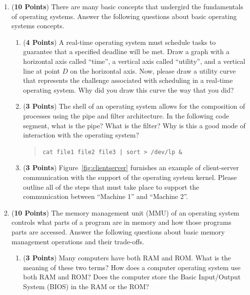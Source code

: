 \documentclass[12pt,epsf,psfig,graphics]{article}
\begin{document}
\begin{enumerate}
\item ({\bf 10 Points}) There are many basic concepts that undergird the fundamentals of operating systems.  Answer the
  following questions about basic operating systems concepts.

  \begin{enumerate}
          
  \item ({\bf 4 Points}) A real-time operating system must schedule tasks to guarantee that a specified deadline will be
    met.  Draw a graph with a horizontal axis called ``time'', a vertical axis called ``utility'', and a vertical line
    at point $D$ on the horizontal axis.  Now, please draw a utility curve that represents the challenge associated with
    scheduling in a real-time operating system. Why did you draw this curve the way that you did?

  \item ({\bf 3 Points}) The shell of an operating system allows for the composition of processes using the pipe and
    filter architecture.  In the following code segment, what is the pipe? What is the filter? Why is this a good mode
    of interaction with the operating system?

    \begin{quote}
      {\tt cat file1 file2 file3 | sort > /dev/lp \&}
    \end{quote}

  \item ({\bf 3 Points}) Figure~\ref{fig:clientserver} furnishes an example of client-server communication with the
    support of the operating system kernel. Please outline all of the steps that must take place to support the
    communication between ``Machine 1'' and ``Machine 2''. 

  \end{enumerate}

  \newpage

\item ({\bf 10 Points}) The memory management unit (MMU) of an operating system controls what parts of a program are in
  memory and how those programs parts are accessed.  Answer the following questions about basic memory management
  operations and their trade-offs.
  
  \begin{enumerate}

    \item ({\bf 3 Points}) Many computers have both RAM and ROM.  What is the meaning of these two terms?  How does a
      computer operating system use both RAM and ROM? Does the computer store the Basic Input/Output System (BIOS) in
      the RAM or the ROM?


\end{enumerate}
\end{enumerate}
\end{document}

